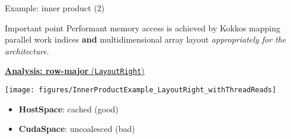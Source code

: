 
\iffull
\begin{frame}[fragile]{Example: inner product (2)}

  \begin{block}{Important point}
    Performant memory access is achieved by Kokkos mapping parallel work indices \textbf{and} multidimensional array layout \emph{appropriately for the architecture}.
  \end{block}

  \pause
  \vspace{3pt}

  \ul{\textbf{Analysis: row-major} (\texttt{LayoutRight})}

  \vspace{-10pt}

  \begin{center}
    \texttt{[image: figures/InnerProductExample\_LayoutRight\_withThreadReads]}
  \end{center}

  \vspace{-28pt}
  \pause

  \begin{itemize}
    \item{\textbf{HostSpace}: cached ({\color{darkgreen}good})}
    \item{\textbf{CudaSpace}: uncoalesced ({\color{red}bad})}
  \end{itemize}

\end{frame}
\fi
\setcounter{subfigure}{0}%



